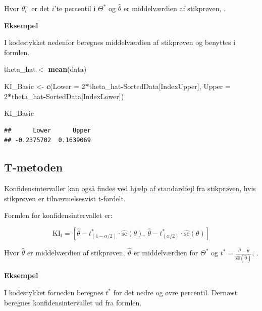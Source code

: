 \documentclass[
]{book}
\newenvironment{Shaded}{\begin{snugshade}}{\end{snugshade}}
\newcommand{\DataTypeTok}[1]{\textcolor[rgb]{0.13,0.29,0.53}{#1}}
\newcommand{\DecValTok}[1]{\textcolor[rgb]{0.00,0.00,0.81}{#1}}
\newcommand{\KeywordTok}[1]{\textcolor[rgb]{0.13,0.29,0.53}{\textbf{#1}}}
\newcommand{\NormalTok}[1]{#1}
\newcommand{\OperatorTok}[1]{\textcolor[rgb]{0.81,0.36,0.00}{\textbf{#1}}}
\newcommand{\StringTok}[1]{\textcolor[rgb]{0.31,0.60,0.02}{#1}}
\theoremstyle{definition}
\theoremstyle{definition}
\theoremstyle{definition}
\theoremstyle{remark}
\begin{document}
Hvor \(\theta^{\sim}_i\) er det \(i\)'te percentil i \(\Theta^*\) og \(\hat\theta\) er middelværdien af stikprøven, \citep{BasicKI}.

\textbf{Eksempel}

I kodestykket nedenfor beregnes middelværdien af stikprøven og benyttes i formlen.

\begin{Shaded}
\begin{Highlighting}[]
\NormalTok{theta_hat <-}\StringTok{ }\KeywordTok{mean}\NormalTok{(data)}

\NormalTok{KI_Basic <-}\StringTok{ }\KeywordTok{c}\NormalTok{(}\DataTypeTok{Lower =} \DecValTok{2}\OperatorTok{*}\NormalTok{theta_hat}\OperatorTok{-}\NormalTok{SortedData[IndexUpper],}
              \DataTypeTok{Upper =} \DecValTok{2}\OperatorTok{*}\NormalTok{theta_hat}\OperatorTok{-}\NormalTok{SortedData[IndexLower])}

\NormalTok{KI_Basic}
\end{Highlighting}
\end{Shaded}

\begin{verbatim}
##      Lower      Upper 
## -0.2375702  0.1639069
\end{verbatim}

\hypertarget{t-metoden}{%
\subsection{T-metoden}\label{t-metoden}}

Konfidensintervaller kan også findes ved hjælp af standardfejl fra stikprøven, hvis stikprøven er tilnærmelsesvist t-fordelt.

Formlen for konfidensintervallet er:

\[\text{KI}_t=\left[\hat\theta-t^{*}_{(1-\alpha/2)}\cdot \hat{\text{se}}(\theta),~\hat\theta-t^{*}_{(\alpha/2)}\cdot\hat{\text{se}}(\theta)\right]\]

Hvor \(\hat\theta\) er middelværdien af stikprøven, \(\hat{\vartheta}\) er middelværdien for \(\Theta^*\) og \(t^{*}=\frac{\hat{\vartheta}-\hat\theta}{\hat{\text{se}}(\hat\vartheta)}\), \citep{TPKI}.

\textbf{Eksempel}

I kodestykket forneden beregnes \(t^{*}\) for det nedre og øvre percentil. Dernæst beregnes konfidensintervallet ud fra formlen.
\end{document}
